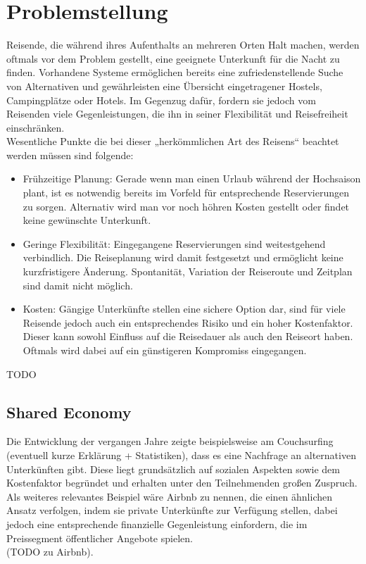 
\section{Problemstellung}
Reisende, die während ihres Aufenthalts an mehreren Orten Halt machen, werden oftmals vor dem Problem gestellt, eine geeignete Unterkunft für die Nacht zu finden. Vorhandene Systeme ermöglichen bereits eine zufriedenstellende Suche von Alternativen und gewährleisten eine Übersicht eingetragener Hostels, Campingplätze oder Hotels. Im Gegenzug dafür, fordern sie jedoch vom Reisenden viele Gegenleistungen, die ihn in seiner Flexibilität und Reisefreiheit einschränken.\\
Wesentliche Punkte die bei dieser „herkömmlichen Art des Reisens“ beachtet werden müssen sind folgende:
\begin{itemize}
   \item Frühzeitige Planung: Gerade wenn man einen Urlaub während der Hochsaison plant, ist es notwendig bereits im Vorfeld für entsprechende Reservierungen zu sorgen. Alternativ wird man vor noch höhren Kosten gestellt oder findet keine gewünschte Unterkunft. 
   \item Geringe Flexibilität: Eingegangene Reservierungen sind weitestgehend verbindlich. Die Reiseplanung wird damit festgesetzt und ermöglicht keine kurzfristigere Änderung. Spontanität, Variation der Reiseroute und Zeitplan sind damit nicht möglich.
   \item Kosten: Gängige Unterkünfte stellen eine sichere Option dar, sind für viele Reisende jedoch auch ein entsprechendes Risiko und ein hoher Kostenfaktor. Dieser kann sowohl Einfluss auf die Reisedauer als auch den Reiseort haben. Oftmals wird dabei auf ein günstigeren Kompromiss eingegangen. 

\end{itemize}

TODO


\subsection{Shared Economy}
Die Entwicklung der vergangen Jahre zeigte beispielsweise am Couchsurfing (eventuell kurze Erklärung + Statistiken), dass es eine Nachfrage an alternativen Unterkünften gibt. Diese liegt grundsätzlich auf sozialen Aspekten sowie dem Kostenfaktor begründet und erhalten unter den Teilnehmenden großen Zuspruch. Als weiteres relevantes Beispiel wäre Airbnb zu nennen, die einen ähnlichen Ansatz verfolgen, indem sie private Unterkünfte zur Verfügung stellen, dabei jedoch eine entsprechende finanzielle Gegenleistung einfordern, die im Preissegment öffentlicher Angebote spielen.\\
(TODO zu Airbnb).\\

